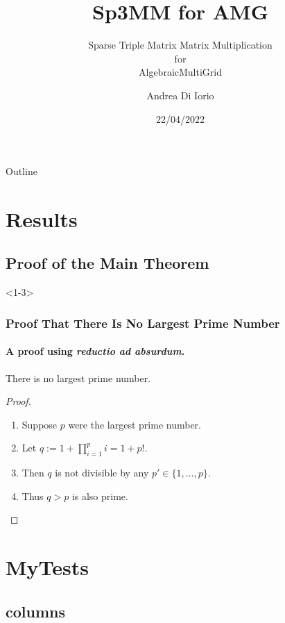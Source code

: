 \documentclass[aspectratio=169]{beamer}
\title{Sp3MM for AMG}
\subtitle{Sparse Triple Matrix Matrix Multiplication\\for\\AlgebraicMultiGrid}
\author{Andrea Di Iorio}
\institute{Università di Roma Tor Vergata}
\date{22/04/2022}
\begin{document}
\begin{frame}
	\titlepage
\end{frame}

\begin{frame}	{Outline}
	\tableofcontents
\end{frame}

\section{Results}
\subsection{Proof of the Main Theorem}

\begin{frame}<1-3>
	\frametitle{Proof That There Is No Largest Prime Number}
	\framesubtitle{A proof using \textit{reductio ad absurdum}.}

	\begin{theorem}
		There is no largest prime number.
	\end{theorem}
	\begin{proof}
		\begin{enumerate}
		\item<1-> Suppose $p$ were the largest prime number.
		\item<2-> Let $q := 1 + \prod_{i=1}^p i = 1+p!$.
		\item<3-> Then $q$ is not divisible by any $p' \in \{1,\dots,p\}$.
		\item<1-> Thus $q>p$ is also prime.\qedhere
		\end{enumerate}
	\end{proof}
\end{frame}

\section{MyTests}
\subsection{columns}
\end{document}
